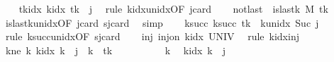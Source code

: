 \begin{isabellebody}
\ \ \isamarkupfalse%
\ tkidx{\isacharcolon}{\kern0pt}\ {\isachardoublequoteopen}k{\isacharunderscore}{\kern0pt}idx\ {\isacharquery}{\kern0pt}tk\ {\isacharequal}{\kern0pt}\ j{\isachardoublequoteclose}\ \isamarkupfalse%
\ {\isacharparenleft}{\kern0pt}rule\ k{\isacharunderscore}{\kern0pt}idx{\isacharunderscore}{\kern0pt}unidx{\isacharbrackleft}{\kern0pt}OF\ jcard{\isacharbrackright}{\kern0pt}{\isacharparenright}{\kern0pt}\isanewline
\ \ \isamarkupfalse%
\ notlast{\isacharcolon}{\kern0pt}\ {\isachardoublequoteopen}{\isasymnot}\ is{\isacharunderscore}{\kern0pt}last{\isacharunderscore}{\kern0pt}k\ M\ {\isacharquery}{\kern0pt}tk{\isachardoublequoteclose}\isanewline
\ \ \ \ \isamarkupfalse%
\ is{\isacharunderscore}{\kern0pt}last{\isacharunderscore}{\kern0pt}k{\isacharunderscore}{\kern0pt}unidx{\isacharbrackleft}{\kern0pt}OF\ jcard{\isacharbrackright}{\kern0pt}\ sjcard\ \isamarkupfalse%
\ simp\isanewline
\ \ \isamarkupfalse%
\ ksucc{\isacharcolon}{\kern0pt}\ {\isachardoublequoteopen}k{\isacharunderscore}{\kern0pt}succ\ {\isacharquery}{\kern0pt}tk\ {\isacharequal}{\kern0pt}\ k{\isacharunderscore}{\kern0pt}unidx\ {\isacharparenleft}{\kern0pt}Suc\ j{\isacharparenright}{\kern0pt}{\isachardoublequoteclose}\ \isamarkupfalse%
\ {\isacharparenleft}{\kern0pt}rule\ k{\isacharunderscore}{\kern0pt}succ{\isacharunderscore}{\kern0pt}unidx{\isacharbrackleft}{\kern0pt}OF\ sjcard{\isacharbrackright}{\kern0pt}{\isacharparenright}{\kern0pt}\isanewline
\ \ \isamarkupfalse%
\ inj{\isacharcolon}{\kern0pt}\ {\isachardoublequoteopen}inj{\isacharunderscore}{\kern0pt}on\ k{\isacharunderscore}{\kern0pt}idx\ UNIV{\isachardoublequoteclose}\ \isamarkupfalse%
\ {\isacharparenleft}{\kern0pt}rule\ k{\isacharunderscore}{\kern0pt}idx{\isacharunderscore}{\kern0pt}inj{\isacharparenright}{\kern0pt}\isanewline
\ \ \isamarkupfalse%
\ kne{\isacharcolon}{\kern0pt}\ {\isachardoublequoteopen}{\isasymAnd}k{\isachardot}{\kern0pt}\ k{\isacharunderscore}{\kern0pt}idx\ k\ {\isacharequal}{\kern0pt}\ j\ {\isasymLongrightarrow}\ k\ {\isacharequal}{\kern0pt}\ {\isacharquery}{\kern0pt}tk{\isachardoublequoteclose}\isanewline
\ \ \isamarkupfalse%
\ {\isacharminus}{\kern0pt}\isanewline
\ \ \ \ \isamarkupfalse%
\ k\ \isamarkupfalse%
\ {\isachardoublequoteopen}k{\isacharunderscore}{\kern0pt}idx\ k\ {\isacharequal}{\kern0pt}\ j{\isachardoublequoteclose}\isanewline
\ \ \ \ \isamarkupfalse%

\end{isabellebody}

